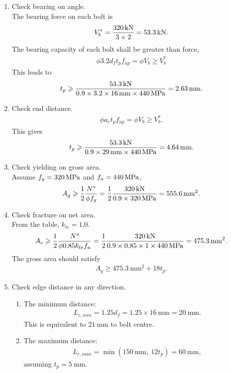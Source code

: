 \begin{solution}
\begin{enumerate}
The number of bolts is then
\begin{gather*}
n\geqslant\dfrac{N^*}{\phi{}V_f}=2.70.
\end{gather*}
Thus use \num{3} bolts.
\item Check bearing on angle.\\
The bearing force on each bolt is
\begin{gather*}
V^*_b=\dfrac{\SI{320}{\kilo\newton}}{3\times2}=\SI{53.3}{\kilo\newton}.
\end{gather*}
The bearing capacity of each bolt shall be greater than force,
\begin{gather*}
\phi3.2d_ft_pf_{up}=\phi{}V_b\geqslant{}V^*_b
\end{gather*}
This leads to
\begin{gather*}
t_p\geqslant\dfrac{\SI{53.3}{\kilo\newton}}{0.9\times3.2\times\SI{16}{\milli\meter}\times\SI{440}{\mega\pascal}}=\SI{2.63}{\milli\meter}.
\end{gather*}
\item Check end distance.
\begin{gather*}
\phi{}a_et_pf_{up}=\phi{}V_b\geqslant{}V^*_b.
\end{gather*}
This gives
\begin{gather*}
t_p\geqslant{}\dfrac{\SI{53.3}{\kilo\newton}}{0.9\times\SI{29}{\milli\meter}\times\SI{440}{\mega\pascal}}=\SI{4.64}{\milli\meter}.
\end{gather*}
\item Check yielding on gross area.\\
Assume $f_y=\SI{320}{\mega\pascal}$ and $f_u=\SI{440}{\mega\pascal}$,
\begin{gather*}
A_g\geqslant\dfrac{1}{2}\dfrac{N^*}{\phi{}f_y}=\dfrac{1}{2}\dfrac{\SI{320}{\kilo\newton}}{0.9\times\SI{320}{\mega\pascal}}=\SI{555.6}{\milli\meter^2}.
\end{gather*}
\item Check fracture on net area.\\
From the table, $k_{te}=1.0$.
\begin{gather*}
A_e\geqslant\dfrac{1}{2}\dfrac{N^*}{\phi{}0.85k_{te}f_u}=\dfrac{1}{2}\dfrac{\SI{320}{\kilo\newton}}{0.9\times0.85\times1\times\SI{440}{\mega\pascal}}=\SI{475.3}{\milli\meter^2}.
\end{gather*}
The gross area should satisfy
\begin{gather*}
A_g\geqslant\SI{475.3}{\mm^2}+18t_p.
\end{gather*}
\item Check edge distance in any direction.
\begin{enumerate}
\item The minimum distance:
\begin{gather*}
L_{e,min}=1.25d_f=1.25\times\SI{16}{\mm}=\SI{20}{\mm}.
\end{gather*}
This is equivalent to $\SI{21}{\mm}$ to bolt centre.
\item The maximum distance:
\begin{align*}
L_{e,max}=\min\left(\SI{150}{\mm},~12t_p\right)=\SI{60}{\mm},
\end{align*}
assuming $t_p=\SI{5}{\mm}$.
\end{enumerate}
\end{enumerate}


\end{solution}
